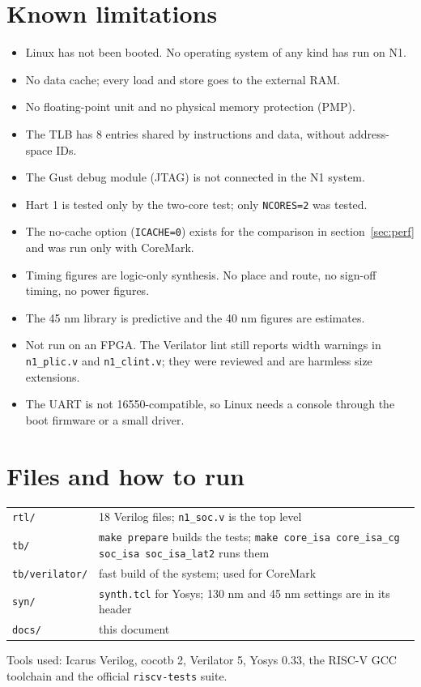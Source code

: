 \documentclass[10pt,a4paper]{article}
\newcommand{\code}[1]{\texttt{#1}}
\begin{document}
\section{Known limitations}
\begin{itemize}
\item Linux has not been booted. No operating system of any kind has run on N1.
\item No data cache; every load and store goes to the external RAM.
\item No floating-point unit and no physical memory protection (PMP).
\item The TLB has 8 entries shared by instructions and data, without address-space IDs.
\item The Gust debug module (JTAG) is not connected in the N1 system.
\item Hart 1 is tested only by the two-core test; only \code{NCORES=2} was tested.
\item The no-cache option (\code{ICACHE=0}) exists for the comparison in section~\ref{sec:perf} and was run only with CoreMark.
\item Timing figures are logic-only synthesis. No place and route, no sign-off timing, no power figures.
\item The 45 nm library is predictive and the 40 nm figures are estimates.
\item Not run on an FPGA. The Verilator lint still reports width warnings in \code{n1\_plic.v} and
\code{n1\_clint.v}; they were reviewed and are harmless size extensions.
\item The UART is not 16550-compatible, so Linux needs a console through the boot firmware or a small driver.
\end{itemize}

\section{Files and how to run}
\begin{center}\small
\begin{tabularx}{\linewidth}{@{}lX@{}}
\toprule
\code{rtl/} & 18 Verilog files; \code{n1\_soc.v} is the top level\\
\code{tb/} & \code{make prepare} builds the tests; \code{make core\_isa core\_isa\_cg soc\_isa soc\_isa\_lat2} runs them\\
\code{tb/verilator/} & fast build of the system; used for CoreMark\\
\code{syn/} & \code{synth.tcl} for Yosys; 130 nm and 45 nm settings are in its header\\
\code{docs/} & this document\\
\bottomrule
\end{tabularx}
\end{center}
Tools used: Icarus Verilog, cocotb 2, Verilator 5, Yosys 0.33, the RISC-V GCC toolchain and the official
\code{riscv-tests} suite.
\end{document}
